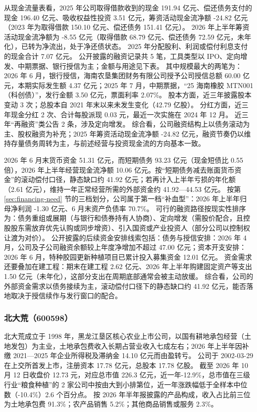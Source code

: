  从现金流量表看，2025 年公司取得借款收到的现金 191.94 亿元、偿还债务支付的现金 196.40 亿元、吸收权益性投资 3.51 亿元，筹资活动现金流净额 -24.82 亿元（2023 年为取得借款 150.10 亿元、偿还债务 151.41 亿元）。 2026 年上半年筹资活动现金流净额为 -8.55 亿元（取得借款 68.79 亿元、偿还债务 72.59 亿元，未年化），已转为净流出，处于净还债状态。 2025 年分配股利、利润或偿付利息支付的现金合计 7.07 亿元。 公开披露的融资记录共 5 笔，工具类型以 IPO、定向增发、中期票据、银行授信为主；金额与用途见下表。 其中规模最大的两笔为：2026 年 6 月，银行授信，海南农垦集团财务有限公司授予公司授信总额 60.00 亿元，本期实际发生额 4.37 亿元；2025 年 7 月，中期票据，“25 海南橡胶 MTN001（科创债）”，发行金额 3.50 亿元，票面利率 2.07\%。 股本方面，近三年披露股本变动 3 次；总股本自 2021 年末以来未发生变化（42.79 亿股）。 分红方面，近三年现金分红 2 次、合计每股派现 0.03 元，最近一次实施在 2024 年 12 月。 近三年“再融资”类公告 2 条，涉及定向增发。 综合看，公司融资结构上以债务滚动为主、股权融资为补充；2025 年筹资活动现金流净额 -24.82 亿元，融资节奏仍以维持存量债务周转为主，与前述经营与投资现金流的方向基本一致。

 2026 年 6 月末货币资金 51.31 亿元，而短期债务 93.23 亿元（现金短债比 0.55 倍），2026 年上半年经营现金流净额 10.06 亿元。按“短期债务减去账面货币资金”的滚动偿付口径，静态缺口约 41.92 亿元；若再计入上半年亏损的年化额（2.61 亿元），维持一年正常经营所需的外部资金约 41.92---44.53 亿元。 按第 \ref{sec:financing-need} 节的三档划分，公司属于第一档“补血型”：2026 年上半年归母净利润 -1.30 亿元、6 月末资产负债率 70.7\%。 可行的融资路径按现实性排序为：债务重组或展期（与银行和债券持有人协商）、定向增发（需股价配合，且控股股东需放弃优先认购或同步增资）、引入国资或产业投资人（部分公司以控制权让渡为对价）。 公开披露的后续资金安排线索包括：债务与授信安排：2026 年 4 月，公司及子公司融资余额较上年度净增加不超过 47.00 亿元；资本开支安排：2026 年 6 月，特种胶园更新种植项目已累计投入募集资金 12.01 亿元。 资金需求还要叠加在建工程：期末在建工程 2.62 亿元、2026 年上半年购建固定资产等支出 1.50 亿元（未年化），这部分支出在周期底部通常会被主动放缓。 综合看，公司的外部资金需求以债务接续为主，滚动偿付口径下的静态缺口约 41.92 亿元，能否落地取决于授信续作与发行窗口的配合。




\subsubsection{北大荒（600598）}
\label{co:600598}

 北大荒成立于 1998 年，黑龙江垦区核心农业上市公司，以国有耕地承包经营（土地发包）为主业，土地承包费收入长期占营业收入七成左右；2026 年上半年因补缴 2021—2025 年企业所得税及滞纳金 14.10 亿元而由盈转亏。 公司于 2002-03-29 在上交所首发上市，注册资本 17.78 亿元，总股本 17.78 亿股。 截至 2026 年 10 月 12 日收盘价 12.73 元，对应总市值 226.3 亿元，近一年-12.9\%，总市值在三级行业“粮食种植”的 2 家公司中按由大到小排第位，近一年涨跌幅低于全样本中位数（-10.4\%）2.6 个百分点。 按 2026 年半年报披露的产品构成，收入占比前三位为土地承包费 91.3\%；农产品销售 5.2\%；其他商品销售或服务 2.3\%。

